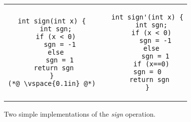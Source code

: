 \begin{figure}
\centering
\begin{tabular}{ccc}
\begin{lstlisting}
int sign(int x) {
  int sgn;
  if (x < 0)
    sgn = -1
  else
    sgn = 1
 return sgn
}
(*@ \vspace{0.1in} @*)
\end{lstlisting}
&
&
\begin{lstlisting}
int sign'(int x) {
  int sgn;
  if (x < 0)
    sgn = -1
  else
    sgn = 1
  if (x==0)
    sgn = 0    
 return sgn
}
\end{lstlisting}
\\
\end{tabular}
\caption{Two simple implementations of the \emph{sign} operation.}
\end{figure}
